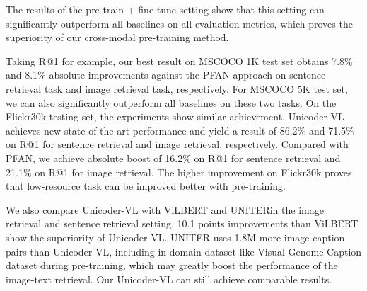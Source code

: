 \documentclass[letterpaper]{article} \usepackage{aaai20}  \usepackage{times}  \usepackage{helvet} \usepackage{courier}  \usepackage[hyphens]{url}  \usepackage{graphicx} \urlstyle{rm} \def\UrlFont{\rm}  \usepackage{graphicx}  \frenchspacing  \setlength{\pdfpagewidth}{8.5in}  \setlength{\pdfpageheight}{11in}  \usepackage{amssymb}
\begin{document}
The results of the pre-train + fine-tune setting show that this setting can significantly outperform all baselines on all evaluation metrics, which proves the superiority of our cross-modal pre-training method. 

Taking R@1 for example, our best result on MSCOCO 1K test set obtains 7.8\% and 8.1\% absolute improvements against the PFAN approach on sentence retrieval task and image retrieval task, respectively. For MSCOCO 5K test set, we can also significantly outperform all baselines on these two tasks. On the Flickr30k testing set, the experiments show similar achievement. Unicoder-VL achieves new state-of-the-art performance and yield a result of 86.2\% and 71.5\% on R@1 for sentence retrieval and image retrieval, respectively. Compared with PFAN, we achieve absolute boost of 16.2\% on R@1 for sentence retrieval and 21.1\% on R@1 for image retrieval. The higher improvement on Flickr30k proves that low-resource task can be improved better with pre-training.

We also compare Unicoder-VL with ViLBERT \cite{lu2019vilbert} and UNITER\cite{chen2019uniter}in the image retrieval and sentence retrieval setting. 10.1 points improvements than ViLBERT show the superiority of Unicoder-VL. UNITER uses 1.8M more image-caption pairs than Unicoder-VL, including in-domain dataset like Visual Genome Caption dataset during pre-training, which may greatly boost the performance of the image-text retrieval. Our Unicoder-VL can still achieve comparable results. 
\begin{table}[!htbp]
\centering
{}
 \caption{Results compared to the state-of-the-art methods with single model on VCR dataset by the time of submission.  means concurrent works. * means that the UNITER's one-stage pre-training result, which is similar to the concurrent work's setting.}
\label{VCRresult}
\end{table}
\end{document}
